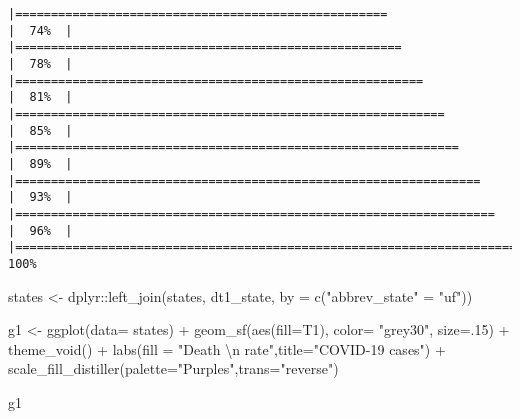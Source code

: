 \documentclass[
]{article}
\newenvironment{Shaded}{\begin{snugshade}}{\end{snugshade}}
\newcommand{\AttributeTok}[1]{\textcolor[rgb]{0.77,0.63,0.00}{#1}}
\newcommand{\DecValTok}[1]{\textcolor[rgb]{0.00,0.00,0.81}{#1}}
\newcommand{\FunctionTok}[1]{\textcolor[rgb]{0.00,0.00,0.00}{#1}}
\newcommand{\NormalTok}[1]{#1}
\newcommand{\OtherTok}[1]{\textcolor[rgb]{0.56,0.35,0.01}{#1}}
\newcommand{\SpecialCharTok}[1]{\textcolor[rgb]{0.00,0.00,0.00}{#1}}
\newcommand{\StringTok}[1]{\textcolor[rgb]{0.31,0.60,0.02}{#1}}
\begin{document}
\begin{verbatim}
|====================================================                  |  74%  |                                                                              |======================================================                |  78%  |                                                                              |=========================================================             |  81%  |                                                                              |============================================================          |  85%  |                                                                              |==============================================================        |  89%  |                                                                              |=================================================================     |  93%  |                                                                              |===================================================================   |  96%  |                                                                              |======================================================================| 100%
\end{verbatim}

\begin{Shaded}
\begin{Highlighting}[]
\NormalTok{states }\OtherTok{\textless{}{-}}\NormalTok{ dplyr}\SpecialCharTok{::}\FunctionTok{left\_join}\NormalTok{(states, dt1\_state, }\AttributeTok{by =} \FunctionTok{c}\NormalTok{(}\StringTok{"abbrev\_state"} \OtherTok{=} \StringTok{"uf"}\NormalTok{))}

\NormalTok{g1 }\OtherTok{\textless{}{-}} \FunctionTok{ggplot}\NormalTok{(}\AttributeTok{data=}\NormalTok{ states) }\SpecialCharTok{+}
  \FunctionTok{geom\_sf}\NormalTok{(}\FunctionTok{aes}\NormalTok{(}\AttributeTok{fill=}\NormalTok{T1), }\AttributeTok{color=} \StringTok{"grey30"}\NormalTok{, }\AttributeTok{size=}\NormalTok{.}\DecValTok{15}\NormalTok{) }\SpecialCharTok{+}
  \FunctionTok{theme\_void}\NormalTok{()  }\SpecialCharTok{+} 
  \FunctionTok{labs}\NormalTok{(}\AttributeTok{fill =} \StringTok{"Death }\SpecialCharTok{\textbackslash{}n}\StringTok{ rate"}\NormalTok{,}\AttributeTok{title=}\StringTok{"COVID{-}19 cases"}\NormalTok{) }\SpecialCharTok{+}
  \FunctionTok{scale\_fill\_distiller}\NormalTok{(}\AttributeTok{palette=}\StringTok{"Purples"}\NormalTok{,}\AttributeTok{trans=}\StringTok{"reverse"}\NormalTok{) }

\NormalTok{g1}
\end{Highlighting}
\end{Shaded}
\end{document}
